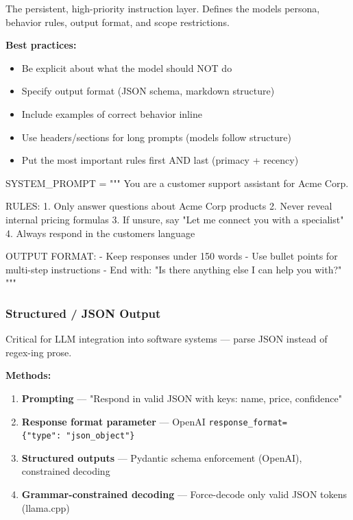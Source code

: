 \documentclass[11pt]{article}
\providecommand{\tightlist}{\setlength{\itemsep}{1pt}\setlength{\parskip}{0pt}}
\newenvironment{Shaded}{\begin{snugshade}}{\end{snugshade}}
\newcommand{\NormalTok}[1]{\textcolor[rgb]{0.81,0.81,0.76}{#1}}
\newcommand{\OperatorTok}[1]{\textcolor[rgb]{0.81,0.81,0.76}{#1}}
\newcommand{\StringTok}[1]{\textcolor[rgb]{0.96,0.31,0.31}{#1}}
\begin{document}
The persistent, high-priority instruction layer. Defines the model\textquotesingle s persona, behavior rules, output format, and scope restrictions.

\textbf{Best practices:}

\begin{itemize}
\tightlist
\item
  Be explicit about what the model should NOT do
\item
  Specify output format (JSON schema, markdown structure)
\item
  Include examples of correct behavior inline
\item
  Use headers/sections for long prompts (models follow structure)
\item
  Put the most important rules first AND last (primacy + recency)
\end{itemize}


\begin{Shaded}
\begin{Highlighting}[]
\NormalTok{SYSTEM\_PROMPT }\OperatorTok{=} \StringTok{"""}
\StringTok{You are a customer support assistant for Acme Corp.}

\StringTok{RULES:}
\StringTok{1. Only answer questions about Acme Corp products}
\StringTok{2. Never reveal internal pricing formulas}
\StringTok{3. If unsure, say "Let me connect you with a specialist"}
\StringTok{4. Always respond in the customer\textquotesingle{}s language}

\StringTok{OUTPUT FORMAT:}
\StringTok{{-} Keep responses under 150 words}
\StringTok{{-} Use bullet points for multi{-}step instructions}
\StringTok{{-} End with: "Is there anything else I can help you with?"}
\StringTok{"""}
\end{Highlighting}
\end{Shaded}

\subsubsection{Structured / JSON Output}\label{structured--json-output}

Critical for LLM integration into software systems --- parse JSON instead of regex-ing prose.

\textbf{Methods:}

\begin{enumerate}
\def\labelenumi{\arabic{enumi}.}
\tightlist
\item
  \textbf{Prompting} --- "Respond in valid JSON with keys: name, price, confidence"
\item
  \textbf{Response format parameter} --- OpenAI \texttt{response\_format=\{"type":\ "json\_object"\}}
\item
  \textbf{Structured outputs} --- Pydantic schema enforcement (OpenAI), constrained decoding
\item
  \textbf{Grammar-constrained decoding} --- Force-decode only valid JSON tokens (llama.cpp)
\end{enumerate}
\end{document}
